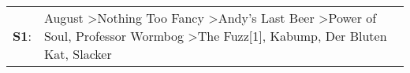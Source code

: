\begin{supertabular}{p{0.03\textwidth}p{0.92\textwidth}}
 \textbf{S1}:  &  August\textsuperscript{} \textgreater \enspace Nothing Too Fancy\textsuperscript{} \textgreater \enspace Andy's Last Beer\textsuperscript{} \textgreater \enspace Power of Soul\textsuperscript{}, \enspace Professor Wormbog\textsuperscript{} \textgreater \enspace The Fuzz[1]\textsuperscript{}, \enspace Kabump\textsuperscript{}, \enspace Der Bluten Kat\textsuperscript{}, \enspace Slacker\textsuperscript{}  \enspace  \\
\end{supertabular}
